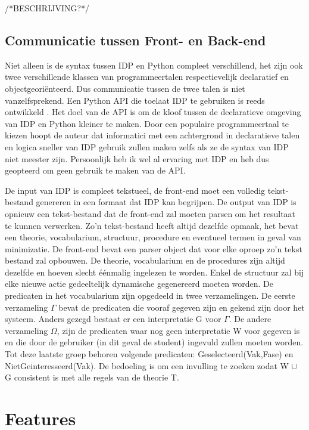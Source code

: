 /*BESCHRIJVING?*/


\subsection{Communicatie tussen Front- en Back-end}
Niet alleen is de syntax tussen IDP en Python compleet verschillend, het zijn ook twee verschillende klassen van programmeertalen respectievelijk declaratief en objectgeori\"{e}nteerd. Dus communicatie tussen de twee talen is niet vanzelfsprekend. Een Python API die toelaat IDP te gebruiken is reeds ontwikkeld \citep{vennekens2015lowering}. Het doel van de API is om de kloof tussen de declaratieve omgeving van IDP en Python kleiner te maken. Door een populaire programmeertaal te kiezen hoopt de auteur dat informatici met een achtergrond in declaratieve talen en logica sneller van IDP gebruik zullen maken zelfs als ze de syntax van IDP niet meester zijn. Persoonlijk heb ik wel al ervaring met IDP en heb dus geopteerd om geen gebruik te maken van de API. 

De input van IDP is compleet tekstueel, de front-end moet een volledig tekst-bestand genereren in een formaat dat IDP kan begrijpen. De output van IDP is opnieuw een tekst-bestand dat de front-end zal moeten parsen om het resultaat te kunnen verwerken. Zo'n tekst-bestand heeft altijd dezelfde opmaak, het bevat een theorie, vocabularium, structuur, procedure en eventueel termen in geval van minimizatie. De front-end bevat een parser object dat voor elke oproep zo'n tekst bestand zal opbouwen. De theorie, vocabularium en de procedures zijn altijd dezelfde en hoeven slecht \'{e}\'{e}nmalig ingelezen te worden. Enkel de structuur zal bij elke nieuwe actie gedeeltelijk dynamische gegenereerd moeten worden. De predicaten in het vocabularium zijn opgedeeld in twee verzamelingen. De eerste verzameling $\Gamma$ bevat de predicaten die vooraf gegeven zijn en gekend zijn door het systeem. Anders gezegd bestaat er een interpretatie G voor $\Gamma$. De andere verzameling $\Omega$, zijn de predicaten waar nog geen interpretatie W voor gegeven is en die door de gebruiker (in dit geval de student) ingevuld zullen moeten worden. Tot deze laatste groep behoren volgende predicaten: Geselecteerd(Vak,Fase) en NietGeinteresseerd(Vak). De bedoeling is om een invulling te zoeken zodat W $\cup$ G consistent is met alle regels van de theorie T.


\section{Features}

